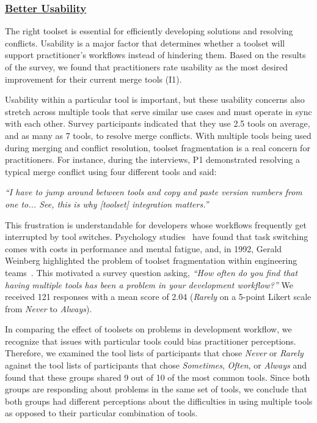 \subsubsection{\underline{Better Usability}}
The right toolset is essential for efficiently developing solutions and resolving conflicts.
Usability is a major factor that determines whether a toolset will support practitioner's workflows instead of hindering them.
Based on the results of the survey, we found that practitioners rate usability as the most desired improvement for their current merge tools (I1).

Usability within a particular tool is important, but these usability concerns also stretch across multiple tools that serve similar use cases and must operate in sync with each other.
Survey participants indicated that they use 2.5 tools on average, and as many as 7 tools, to resolve merge conflicts.
With multiple tools being used during merging and conflict resolution, toolset fragmentation is a real concern for practitioners.
For instance, during the interviews, P1 demonstrated resolving a typical merge conflict using four different tools and said: 
\begin{displayquote}
\textit{``I have to jump around between tools and copy and paste version numbers from one to... See, this is why [toolset] integration matters.''}
\end{displayquote}

This frustration is understandable for developers whose workflows frequently get interrupted by tool switches. Psychology studies~\cite{Meiran2000}\cite{gopher2000switching} have found that task switching comes with costs in performance and mental fatigue, and, in 1992, Gerald Weinberg highlighted the problem of toolset fragmentation within engineering teams~\cite{Weinberg1992}. 
This motivated a survey question asking, \textit{``How often do you find that having multiple tools has been a problem in your development workflow?''} We received 121 responses with a mean score of 2.04 (\textit{Rarely} on a 5-point Likert scale from \textit{Never} to \textit{Always}). 

In comparing the effect of toolsets on problems in development workflow, we recognize that issues with particular tools could bias practitioner perceptions.
Therefore, we examined the tool lists of participants that chose \textit{Never} or \textit{Rarely} against the tool lists of participants that chose \textit{Sometimes}, \textit{Often}, or \textit{Always} and found that these groups shared 9 out of 10 of the most common tools.
Since both groups are responding about problems in the same set of tools, we conclude that both groups had different perceptions about the difficulties in using multiple tools as opposed to their particular combination of tools.

